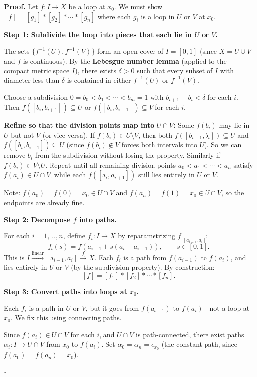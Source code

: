 \documentclass[11pt]{report}
\renewenvironment{proof}[1][Proof]{\noindent\textbf{#1.} }{\hfill$\square$\par\vspace{5pt}}
\begin{document}
\begin{proof}
Let $f: I \to X$ be a loop at $x_0$. We must show $[f] = [g_1] * [g_2] * \cdots * [g_n]$ where each $g_i$ is a loop in $U$ or $V$ at $x_0$.

\textbf{Step 1: Subdivide the loop into pieces that each lie in $U$ or $V$.}

The sets $\{f^{-1}(U), f^{-1}(V)\}$ form an open cover of $I = [0, 1]$ (since $X = U \cup V$ and $f$ is continuous). By the \textbf{Lebesgue number lemma} (applied to the compact metric space $I$), there exists $\delta > 0$ such that every subset of $I$ with diameter less than $\delta$ is contained in either $f^{-1}(U)$ or $f^{-1}(V)$.

Choose a subdivision $0 = b_0 < b_1 < \cdots < b_m = 1$ with $b_{i+1} - b_i < \delta$ for each $i$. Then $f([b_i, b_{i+1}]) \subseteq U$ or $f([b_i, b_{i+1}]) \subseteq V$ for each $i$.

\textbf{Refine so that the division points map into $U \cap V$:} Some $f(b_i)$ may lie in $U$ but not $V$ (or vice versa). If $f(b_i) \in U \setminus V$, then both $f([b_{i-1}, b_i]) \subseteq U$ and $f([b_i, b_{i+1}]) \subseteq U$ (since $f(b_i) \notin V$ forces both intervals into $U$). So we can remove $b_i$ from the subdivision without losing the property. Similarly if $f(b_i) \in V \setminus U$. Repeat until all remaining division points $a_0 < a_1 < \cdots < a_n$ satisfy $f(a_i) \in U \cap V$, while each $f([a_i, a_{i+1}])$ still lies entirely in $U$ or $V$.

Note: $f(a_0) = f(0) = x_0 \in U \cap V$ and $f(a_n) = f(1) = x_0 \in U \cap V$, so the endpoints are already fine.

\textbf{Step 2: Decompose $f$ into paths.}

For each $i = 1, \ldots, n$, define $f_i: I \to X$ by reparametrizing $f|_{[a_{i-1}, a_i]}$:
\[f_i(s) = f(a_{i-1} + s(a_i - a_{i-1})), \qquad s \in [0, 1].\]
This is $I \xrightarrow{\text{linear}} [a_{i-1}, a_i] \xrightarrow{f} X$. Each $f_i$ is a path from $f(a_{i-1})$ to $f(a_i)$, and lies entirely in $U$ or $V$ (by the subdivision property). By construction:
\[[f] = [f_1] * [f_2] * \cdots * [f_n].\]

\textbf{Step 3: Convert paths into loops at $x_0$.}

Each $f_i$ is a path in $U$ or $V$, but it goes from $f(a_{i-1})$ to $f(a_i)$---not a loop at $x_0$. We fix this using connecting paths.

Since $f(a_i) \in U \cap V$ for each $i$, and $U \cap V$ is path-connected, there exist paths $\alpha_i: I \to U \cap V$ from $x_0$ to $f(a_i)$. Set $\alpha_0 = \alpha_n = e_{x_0}$ (the constant path, since $f(a_0) = f(a_n) = x_0$).


\end{proof}
\end{document}

